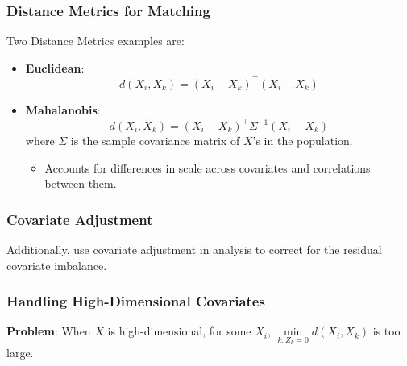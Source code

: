 
\subsubsection{Distance Metrics for Matching}
 Two Distance Metrics examples are:
\begin{itemize}
    \item \textbf{Euclidean}: 
    \[
    d(X_i, X_k) = (X_i - X_k)^\top (X_i - X_k)
    \]
    \item \textbf{Mahalanobis}: 
    \[
    d(X_i, X_k) = (X_i - X_k)^\top \Sigma^{-1} (X_i - X_k)
    \]
    where $\Sigma$ is the sample covariance matrix of $X$'s in the population.
    \begin{itemize}
        \item Accounts for differences in scale across covariates and correlations between them.
    \end{itemize}
\end{itemize}

\subsubsection{Covariate Adjustment}
Additionally, use covariate adjustment in analysis to correct for the residual covariate imbalance.

\subsubsection{Handling High-Dimensional Covariates}
\textbf{Problem}: When $X$ is high-dimensional, for some $X_i$, $\min\limits_{k: Z_k = 0} d(X_i, X_k)$ is too large.

